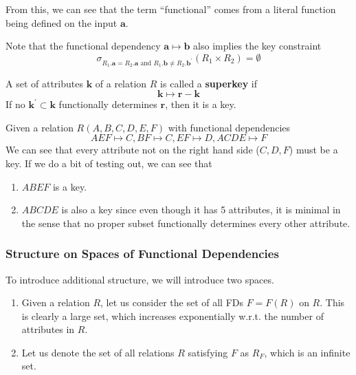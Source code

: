 \documentclass{article}
\begin{document}
      From this, we can see that the term ``functional'' comes from a literal function being defined on the input $\mathbf{a}$. 

      \begin{lemma}
        Note that the functional dependency $\mathbf{a} \mapsto \mathbf{b}$ also implies the key constraint 
        \begin{equation}
          \sigma_{R_1.\mathbf{a} = R_2.\mathbf{a} \text{ and } R_1.\mathbf{b} \neq R_2.\mathbf{b}^\prime} (R_1 \times R_2) = \emptyset
        \end{equation}
      \end{lemma}

      \begin{definition}[Superkey]
        A set of attributes $\mathbf{k}$ of a relation $R$ is called a \textbf{superkey} if 
        \begin{equation}
          \mathbf{k} \mapsto \mathbf{r} - \mathbf{k}
        \end{equation}
        If no $\mathbf{k}^\prime \subset \mathbf{k}$ functionally determines $\mathbf{r}$, then it is a key. 
      \end{definition}
      
      \begin{example}
        Given a relation $R(A, B, C, D, E, F)$ with functional dependencies 
        \begin{equation}
          AEF \mapsto C, BF \mapsto C, EF \mapsto D, ACDE \mapsto F
        \end{equation}
        We can see that every attribute not on the right hand side ($C, D, F$) must be a key. If we do a bit of testing out, we can see that 
        \begin{enumerate}
          \item $ABEF$ is a key. 
          \item $ABCDE$ is also a key since even though it has 5 attributes, it is minimal in the sense that no proper subset functionally determines every other attribute.   
        \end{enumerate}
      \end{example}

    \subsubsection{Structure on Spaces of Functional Dependencies}

      To introduce additional structure, we will introduce two spaces. 
      \begin{enumerate}
        \item Given a relation $R$, let us consider the set of all FDs $F = F(R)$ on $R$. This is clearly a large set, which increases exponentially w.r.t. the number of attributes in $R$. 
        \item Let us denote the set of all relations $R$ satisfying $F$ as $R_F$, which is an infinite set. 
      \end{enumerate}
\end{document}
